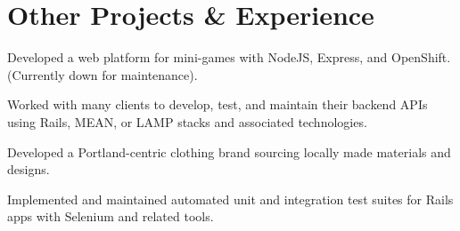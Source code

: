 \documentclass[]{jhearn-resume}
\begin{document}
\begin{minipage}[t]{0.65\textwidth} 
\vspace{-11pt}
\noindent\makebox[\linewidth]{\rule{1000pt}{0.4pt}}
\vspace{-5pt}

\section{Other Projects \& Experience}

\begin{tightemize}
\item Developed a web platform for mini-games with NodeJS, Express, and OpenShift. (Currently down for maintenance).
\end{tightemize}
\sectionsep

\begin{tightemize}
\item Worked with many clients to develop, test, and maintain their backend APIs using Rails, MEAN, or LAMP stacks and associated technologies.
\end{tightemize}
\sectionsep

\begin{tightemize}
\item Developed a Portland-centric clothing brand sourcing locally made materials and designs.
\end{tightemize}
\sectionsep

\begin{tightemize}
\item Implemented and maintained automated unit and integration test suites for Rails apps with Selenium and related tools.
\end{tightemize}
\sectionsep


\end{minipage}
\end{document}
